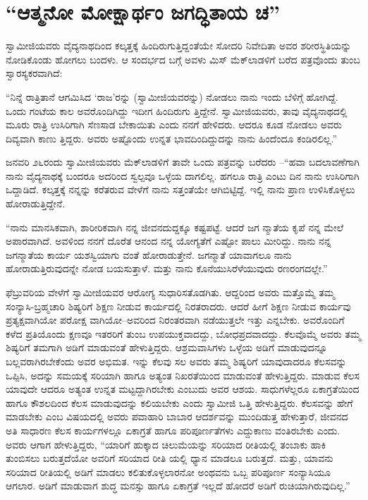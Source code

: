 
\chapter{“ಆತ್ಮನೋ ಮೋಕ್ಷಾರ್ಥಂ ಜಗದ್ಧಿತಾಯ ಚ”}

\noindent

ಸ್ವಾಮೀಜಿಯವರು ವೈದ್ಯನಾಥದಿಂದ ಕಲ್ಕತ್ತಕ್ಕೆ ಹಿಂದಿರುಗುತ್ತಿದ್ದಂತೆಯೇ ಸೋದರಿ ನಿವೇದಿತಾ ಅವರ ಶರೀರಸ್ಥಿತಿಯನ್ನು ನೋಡಿಕೊಂಡು ಹೋಗಲು ಬಂದಳು. ಆ ಸಂದರ್ಭದ ಬಗ್ಗೆ ಅವಳು ಮಿಸ್ ಮೆಕ್​ಲಾಡಳಿಗೆ ಬರೆದ ಪತ್ರವೊಂದು ತುಂಬ ಸ್ವಾರಸ್ಯಕರವಾಗಿದೆ:

“ನಿನ್ನೆ ರಾತ್ರಿತಾನೆ ಆಗಮಿಸಿದ ‘ರಾಜ’ರನ್ನು (ಸ್ವಾಮೀಜಿಯವರನ್ನು) ನೋಡಲು ನಾನು ಇಂದು ಬೆಳಿಗ್ಗೆ ಹೋಗಿದ್ದೆ. ಒಂದು ಗಂಟೆಯ ಕಾಲ ಅವರೊಂದಿಗಿದ್ದು ಇದೀಗ ಹಿಂದಿರುಗು ತ್ತಿದ್ದೇನೆ. ಸ್ವಾಮೀಜಿಯವರು, ತಾವು ವೈದ್ಯನಾಥದಲ್ಲಿ ಮೂರು ರಾತ್ರಿ ಉಸಿರಿಗಾಗಿ ಸೆಣಸಾಡ ಬೇಕಾಯಿತು ಎಂದು ನನಗೆ ಹೇಳಿದರು. ಆದರೂ ಕೂಡ ನೋಡಲು ಅವರು ದಿವ್ಯವಾಗಿ ಕಾಣು ತ್ತಿದ್ದರು. ಅವರು ಅಷ್ಟೊಂದು ಉನ್ನತ ಭಾವದಿಂದಿದ್ದುದನ್ನು ನಾನು ಹಿಂದೆಂದೂ ಕಂಡಿರಲಿಲ್ಲ.”

ಜನವರಿ ೨೬ರಂದು ಸ್ವಾಮೀಜಿಯವರು ಮೆಕ್​ಲಾಡಳಿಗೆ ತಾವೇ ಒಂದು ಪತ್ರವನ್ನು ಬರೆದರು –“ಹವಾ ಬದಲಾವಣೆಗಾಗಿ ನಾನು ವೈದ್ಯನಾಥಕ್ಕೆ ಬಂದರೂ ಅದರಿಂದ ಸ್ವಲ್ಪವೂ ಒಳ್ಳೆಯ ದಾಗಲಿಲ್ಲ. ಹಗಲೂ ರಾತ್ರಿ ಎಂಟು ದಿನ ನಾನು ಉಸಿರಿಗಾಗಿ ಒದ್ದಾಡಿದೆ. ಕಲ್ಕತ್ತಕ್ಕೆ ನನ್ನನ್ನು ಕರೆತರುವ ವೇಳೆಗೆ ನಾನು ಸತ್ತಂತೆಯೇ ಆಗಿಬಿಟ್ಟಿದ್ದೆ. ಇಲ್ಲಿ ನಾನು ಪ್ರಾಣ ಉಳಿಸಿಕೊಳ್ಳಲು ಹೋರಾಡುತ್ತಿದ್ದೇನೆ.

“ನಾನು ಮಾನಸಿಕವಾಗಿ, ಶಾರೀರಿಕವಾಗಿ ನನ್ನ ಜೀವನದುದ್ದಕ್ಕೂ ಕಷ್ಟಪಟ್ಟೆ. ಆದರೆ ಜಗ ನ್ಮಾತೆಯ ಕೃಪೆ ನನ್ನ ಮೇಲೆ ಅಪಾರವಾಗಿದೆ. ಅವಳಿಂದ ನನಗೆ ದೊರೆತ ಆನಂದ ನನ್ನ ಯೋಗ್ಯತೆಗೆ ಎಷ್ಟೋ ಪಾಲು ಮೀರಿದ್ದು. ನಾನು ನನ್ನ ಜಗನ್ಮಾತೆಯ ಕಾರ್ಯ ಯಶಸ್ವಿಯಾಗು ವಂತೆ ಹೋರಾಡುತ್ತೇನೆ. ಜಗನ್ಮಾತೆ ಯಾವಾಗಲೂ ನಾನು ಹೋರಾಡುತ್ತಿರುವುದನ್ನೇ ನೋಡ ಬಯಸುತ್ತಾಳೆ. ಮತ್ತು ನಾನು ಕೊನೆಯುಸಿರೆಳೆಯುವುದು ರಣರಂಗದಲ್ಲೇ.”

ಫೆಬ್ರುವರಿಯ ವೇಳೆಗೆ ಸ್ವಾಮೀಜಿಯವರ ಆರೋಗ್ಯ ಸುಧಾರಿಸತೊಡಗಿತು. ಆದ್ದರಿಂದ ಅವರು ಮತ್ತೊಮ್ಮೆ ತಮ್ಮ ಸಂನ್ಯಾಸಿ-ಬ್ರಹ್ಮಚಾರಿ ಶಿಷ್ಯರಿಗೆ ಶಿಕ್ಷಣ ನೀಡುವ ಕಾರ್ಯದಲ್ಲಿ ನಿರತರಾದರು. ಆದರೆ ಹೀಗೆ ಶಿಕ್ಷಣ ನೀಡುವ ಕಾರ್ಯವು ಪ್ರತ್ಯಕ್ಷವಾಗಿಯೋ ಪರೋಕ್ಷ ವಾಗಿಯೋ–ಅವರಿಂದ ನಿರಂತರವಾಗಿ ನಡೆಯುತ್ತಲೇ ಇತ್ತು ಎನ್ನಬೇಕು. ಅವರೊಂದಿಗೆ ಕಳೆದ ಪ್ರತಿಯೊಂದು ಕ್ಷಣವೂ ಇತರರಿಗೆ ತುಂಬ ಉಪಯುಕ್ತವಾದದ್ದು, ಬೋಧಪ್ರದವಾದದ್ದು. ಕೆಲವೊಮ್ಮೆ ಅವರು ತಮ್ಮ ಶಿಷ್ಯರಿಗೆ ತಮಗಾಗಿ ಅಡಿಗೆ ಮಾಡುವಂತೆ ಹೇಳುತ್ತಿದ್ದರು. ಆಶ್ರಮವಾಸಿಗಳು ಒಳ್ಳೆಯ ಅಡಿಗೆ ಮಾಡುವುದನ್ನೂ ಬಲ್ಲವರಾಗಿರಬೇಕೆಂದು ಅವರ ಅಭಿಮತ. ಇನ್ನು ಕೆಲವು ಸಲ ಅವರು ತಮ್ಮ ಶಿಷ್ಯರಿಗೆ ಯಾವುದಾದರೂ ಕೆಲಸವನ್ನು ಒಪ್ಪಿಸಿ, ಅದನ್ನು ಸಮಯಕ್ಕೆ ಸರಿಯಾಗಿ ಹಾಗೂ ಅತ್ಯಂತ ನಿಖರತೆಯಿಂದ ಮಾಡುವಂತೆ ಹೇಳುತ್ತಿದ್ದರು. ಮಾಡುವ ಕೆಲಸ ಯಾವುದೇ ಆದರೂ ಅತ್ಯಂತ ಉನ್ನತ ಮಟ್ಟದ್ದಾಗಿರಬೇಕು ಎಂಬುದು ಅವರ ಆಶಯ. ಸಾಧುಗಳೆಲ್ಲರೂ ಏಕಾಗ್ರತೆಯಿಂದ ಹಾಗೂ ಕೌಶಲದಿಂದ ಕೆಲಸ ಮಾಡುವುದನ್ನು ಕಲಿಯಬೇಕು ಎಂದು ಸ್ವಾಮೀಜಿ ಒತ್ತಿ ಹೇಳುತ್ತಿದ್ದರು. ಕೆಲಸವನ್ನು ಹೇಗೆ ಮಾಡಬೇಕು ಎಂಬ ವಿಷಯದಲ್ಲಿ ಅವರು ಪವಾಹಾರಿ ಬಾಬಾರ ಆದರ್ಶವನ್ನು ಮುಂದಿಡುತ್ತ ಹೇಳುತ್ತಾರೆ, ಜೀವನದ ಅತಿ ಸಾಧಾರಣ ಕೆಲಸ ಕಾರ್ಯಗಳಲ್ಲೂ ಏಕಾಗ್ರತೆ ಹಾಗೂ ಪರಿಪೂರ್ಣತೆಗಳು ಎದ್ದುಕಾಣು ವಂತಿರಬೇಕು ಎಂದು. ಅವರು ಆಗಾಗ ಹೇಳುತ್ತಿದ್ದರು, “ಯಾರಿಗೆ ಹುಕ್ಕಾದ ಚಿಲುಮೆಯನ್ನು ಸರಿಯಾದ ರೀತಿಯಲ್ಲಿ ತಂಬಾಕು ಹಾಕಿ ತುಂಬಿಸಲು ಬರುತ್ತದೆಯೋ ಅವರಿಗೆ ಸರಿಯಾದ ರೀತಿ ಯಲ್ಲಿ ಧ್ಯಾನ ಮಾಡಲೂ ಬರುತ್ತದೆ. ಮತ್ತು, ಯಾವನು ಸರಿಯಾದ ರೀತಿಯಲ್ಲಿ ಅಡಿಗೆ ಮಾಡಲು ಕಲಿತುಕೊಳ್ಳಲಾರನೋ ಅಂಥವನು ಒಬ್ಬ ಪರಿಪೂರ್ಣ ಸಂನ್ಯಾಸಿಯೂ ಆಗಲಾರ. ಅಡಿಗೆ ಮಾಡುವಾಗ ಶುದ್ಧ ಮನಸ್ಸು ಹಾಗೂ ಏಕಾಗ್ರತೆ ಇಲ್ಲದೆ ಹೋದರೆ ಅಡಿಗೆ ರುಚಿಯಾಗಿರುವುದಿಲ್ಲ.”

